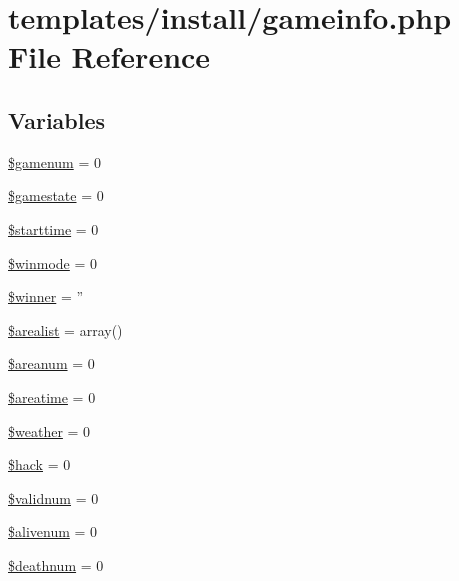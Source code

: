 \hypertarget{templates_2install_2gameinfo_8php}{\section{templates/install/gameinfo.php File Reference}
\label{templates_2install_2gameinfo_8php}
}
\subsection*{Variables}
\begin{DoxyCompactItemize}
\item 
\hyperlink{templates_2install_2gameinfo_8php_a98c5bf2ec517c70a0b24d0486da99fbf}{\$gamenum} = 0
\item 
\hyperlink{templates_2install_2gameinfo_8php_a3d9f29a8eb6c28b1e2a35cc7a6c61baa}{\$gamestate} = 0
\item 
\hyperlink{templates_2install_2gameinfo_8php_af757b2eb3e5f4761dd88804929e413ea}{\$starttime} = 0
\item 
\hyperlink{templates_2install_2gameinfo_8php_afe89a6c5b88f243cfb7699a60ed3e0f3}{\$winmode} = 0
\item 
\hyperlink{templates_2install_2gameinfo_8php_ad92744668d7f5e7b2ee5b87fe8a845f2}{\$winner} = ''
\item 
\hyperlink{templates_2install_2gameinfo_8php_a692d2363b048bb3fcdb65bf6bde8d9e6}{\$arealist} = array()
\item 
\hyperlink{templates_2install_2gameinfo_8php_a23e1b0df49f9669284a6b829a473a53c}{\$areanum} = 0
\item 
\hyperlink{templates_2install_2gameinfo_8php_a09c35ae4cf3040a5cd4d20a69f894015}{\$areatime} = 0
\item 
\hyperlink{templates_2install_2gameinfo_8php_a7c88c8dfcf14e98d581073a25966ec09}{\$weather} = 0
\item 
\hyperlink{templates_2install_2gameinfo_8php_a3403384c1a586a131e24cd874485de0a}{\$hack} = 0
\item 
\hyperlink{templates_2install_2gameinfo_8php_a54f1a166645794ce06e05051071a0d53}{\$validnum} = 0
\item 
\hyperlink{templates_2install_2gameinfo_8php_af96bde4637269c1f0053ba4ac66a8f87}{\$alivenum} = 0
\item 
\hyperlink{templates_2install_2gameinfo_8php_ac8cccc0e21ebd6828150700b1436a5f8}{\$deathnum} = 0
\end{DoxyCompactItemize}


